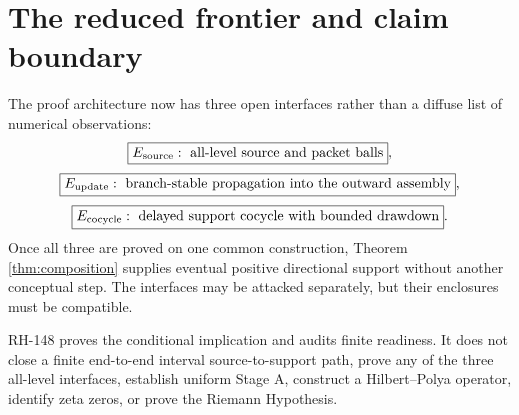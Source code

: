 \documentclass[12pt]{article}
\begin{document}
\section{The reduced frontier and claim boundary}
The proof architecture now has three open interfaces rather than a diffuse
list of numerical observations:
\[
 \boxed{E_{\rm source}:\ \text{all-level source and packet balls}},
\]
\[
 \boxed{E_{\rm update}:\ \text{branch-stable propagation into the outward assembly}},
\]
\[
 \boxed{E_{\rm cocycle}:\ \text{delayed support cocycle with bounded drawdown}}.
\]
Once all three are proved on one common construction, Theorem
\ref{thm:composition} supplies eventual positive directional support without
another conceptual step.  The interfaces may be attacked separately, but
their enclosures must be compatible.

RH-148 proves the conditional implication and audits finite readiness.  It
does not close a finite end-to-end interval source-to-support path, prove any
of the three all-level interfaces, establish uniform Stage A, construct a
Hilbert--Polya operator, identify zeta zeros, or prove the Riemann Hypothesis.



\end{document}

